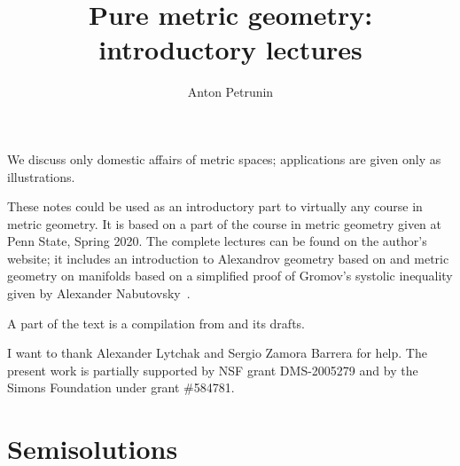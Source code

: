 \documentclass[twoside]{book}
\begin{document}
 
\title{Pure metric geometry:\\
introductory lectures}
\author{Anton Petrunin}
\date{}
\maketitle

We discuss only domestic affairs of metric spaces;
applications are given only as illustrations.

These notes could be used as an introductory part to virtually any course in metric geometry.
It is based on a part of the course in metric geometry given at Penn State, Spring 2020.
The complete lectures can be found on the author's website;
it includes an introduction to Alexandrov geometry based on \cite{alexander-kapovitch-petrunin-2019} and metric geometry on manifolds \cite{petrunin2020} based on a simplified proof of Gromov's systolic inequality given by Alexander Nabutovsky~\cite{nabutovsky}.

A part of the text is a compilation from \cite{alexander-kapovitch-petrunin-2019, alexander-kapovitch-petrunin-2025, petrunin-yashinski, petrunin-2009, petrunin-zamorabarrera} and its drafts.

I want to thank Alexander Lytchak and Sergio Zamora Barrera for help.
The present work is partially supported by NSF grant DMS-2005279
and by the Simons Foundation under grant \#584781.

\thispagestyle{empty}
\tableofcontents
\thispagestyle{empty}






%

\appendix
\chapter{Semisolutions}






{\small\sloppy


\printbibliography[heading=bibintoc]
\fussy
}
\end{document}
